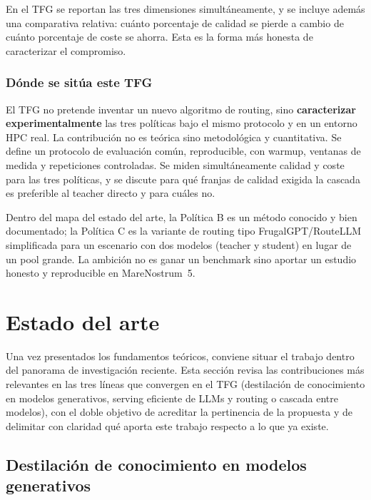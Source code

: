 En el TFG se reportan las tres dimensiones simultáneamente, y se incluye además una comparativa relativa: cuánto porcentaje de calidad se pierde a cambio de cuánto porcentaje de coste se ahorra. Esta es la forma más honesta de caracterizar el compromiso.

\subsubsection{Dónde se sitúa este TFG}

El TFG no pretende inventar un nuevo algoritmo de routing, sino \textbf{caracterizar experimentalmente} las tres políticas bajo el mismo protocolo y en un entorno HPC real. La contribución no es teórica sino metodológica y cuantitativa. Se define un protocolo de evaluación común, reproducible, con warmup, ventanas de medida y repeticiones controladas. Se miden simultáneamente calidad y coste para las tres políticas, y se discute para qué franjas de calidad exigida la cascada es preferible al teacher directo y para cuáles no.

Dentro del mapa del estado del arte, la Política B es un método conocido y bien documentado; la Política C es la variante de routing tipo FrugalGPT/RouteLLM simplificada para un escenario con dos modelos (teacher y student) en lugar de un pool grande. La ambición no es ganar un benchmark sino aportar un estudio honesto y reproducible en MareNostrum~5.

\section{Estado del arte}
\label{sec:estado-del-arte}

Una vez presentados los fundamentos teóricos, conviene situar el trabajo dentro del panorama de investigación reciente. Esta sección revisa las contribuciones más relevantes en las tres líneas que convergen en el TFG (destilación de conocimiento en modelos generativos, serving eficiente de LLMs y routing o cascada entre modelos), con el doble objetivo de acreditar la pertinencia de la propuesta y de delimitar con claridad qué aporta este trabajo respecto a lo que ya existe.

\subsection{Destilación de conocimiento en modelos generativos}

